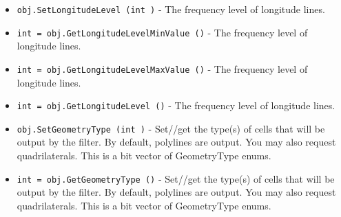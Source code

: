 \begin{itemize}
\item  \verb|obj.SetLongitudeLevel (int )| -  The frequency level of longitude lines.

\item  \verb|int = obj.GetLongitudeLevelMinValue ()| -  The frequency level of longitude lines.

\item  \verb|int = obj.GetLongitudeLevelMaxValue ()| -  The frequency level of longitude lines.

\item  \verb|int = obj.GetLongitudeLevel ()| -  The frequency level of longitude lines.

\item  \verb|obj.SetGeometryType (int )| -  Set//get the type(s) of cells that will be
 output by the filter. By default, polylines
 are output. You may also request quadrilaterals. 
 This is a bit vector of GeometryType enums.

\item  \verb|int = obj.GetGeometryType ()| -  Set//get the type(s) of cells that will be
 output by the filter. By default, polylines
 are output. You may also request quadrilaterals. 
 This is a bit vector of GeometryType enums.

\end{itemize}
